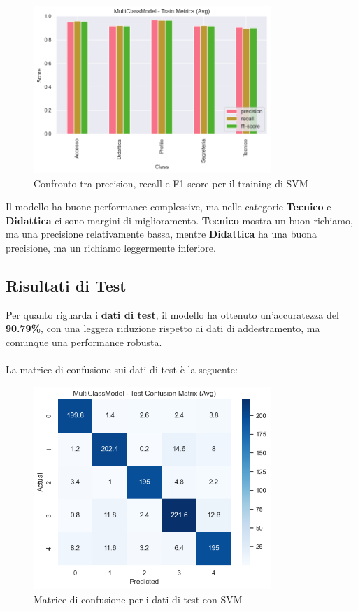 \begin{figure}[H]
    \centering
    \includegraphics[width=0.8\textwidth]{images/metrics_train_svm.png}
    \caption{Confronto tra precision, recall e F1-score per il training di SVM}
    \label{fig:metrics_train_svm}
\end{figure}

Il modello ha buone performance complessive, ma nelle categorie \textbf{Tecnico} e \textbf{Didattica} ci sono margini di miglioramento. \textbf{Tecnico} mostra un buon richiamo, ma una precisione relativamente bassa, mentre \textbf{Didattica} ha una buona precisione, ma un richiamo leggermente inferiore.

\newpage

\subsection{Risultati di Test}

Per quanto riguarda i \textbf{dati di test}, il modello ha ottenuto un'accuratezza del \textbf{90.79\%}, con una leggera riduzione rispetto ai dati di addestramento, ma comunque una performance robusta. \\ \\
La matrice di confusione sui dati di test è la seguente:

\begin{figure}[H]
    \centering
    \includegraphics[width=0.8\textwidth]{images/confusion_matrix_test_svm.png}
    \caption{Matrice di confusione per i dati di test con SVM}
    \label{fig:confusion_matrix_test_svm}
\end{figure}

